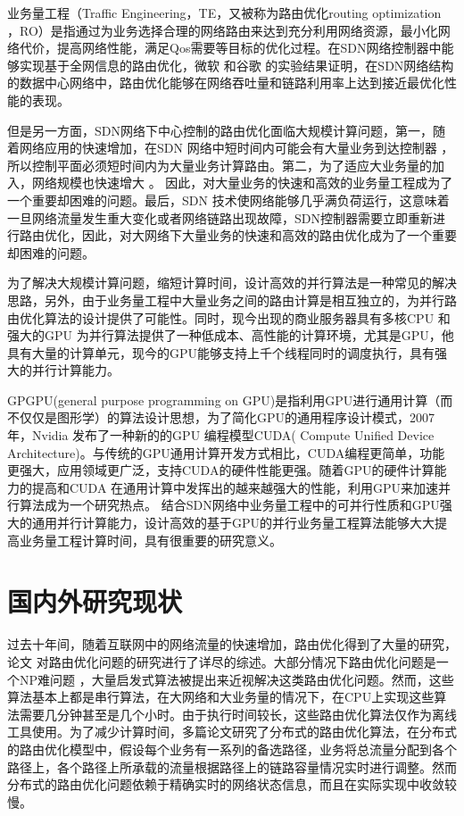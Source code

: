 \documentclass[master]{thesis-uestc}
\begin{document}
业务量工程（Traffic Engineering，TE，又被称为路由优化routing optimization ，RO）是指通过为业务选择合理的网络路由来达到充分利用网络资源，最小化网络代价，提高网络性能，满足Qos需要等目标的优化过程。在SDN网络控制器中能够实现基于全网信息的路由优化，微软 \cite{Microsoft}和谷歌 \cite{Google}的实验结果证明，在SDN网络结构的数据中心网络中，路由优化能够在网络吞吐量和链路利用率上达到接近最优化性能的表现。

但是另一方面，SDN网络下中心控制的路由优化面临大规模计算问题，第一，随着网络应用的快速增加，在SDN 网络中短时间内可能会有大量业务到达控制器 \cite{application}，所以控制平面必须短时间内为大量业务计算路由。第二，为了适应大业务量的加入，网络规模也快速增大\cite{5G} \cite{DCN}。 因此，对大量业务的快速和高效的业务量工程成为了一个重要却困难的问题。最后，SDN 技术使网络能够几乎满负荷运行\cite{Secondrouting}，这意味着一旦网络流量发生重大变化或者网络链路出现故障，SDN控制器需要立即重新进行路由优化，因此，对大网络下大量业务的快速和高效的路由优化成为了一个重要却困难的问题。

为了解决大规模计算问题，缩短计算时间，设计高效的并行算法是一种常见的解决思路，另外，由于业务量工程中大量业务之间的路由计算是相互独立的，为并行路由优化算法的设计提供了可能性。同时，现今出现的商业服务器具有多核CPU 和强大的GPU 为并行算法提供了一种低成本、高性能的计算环境，尤其是GPU，他具有大量的计算单元，现今的GPU能够支持上千个线程同时的调度执行，具有强大的并行计算能力。

GPGPU(general purpose programming on GPU)是指利用GPU进行通用计算（而不仅仅是图形学）的算法设计思想，为了简化GPU的通用程序设计模式，2007 年，Nvidia 发布了一种新的的GPU 编程模型CUDA( Compute Unified Device Architecture)\cite{CUDA}。与传统的GPU通用计算开发方式相比，CUDA编程更简单，功能更强大，应用领域更广泛，支持CUDA的硬件性能更强。随着GPU的硬件计算能力的提高和CUDA 在通用计算中发挥出的越来越强大的性能，利用GPU来加速并行算法成为一个研究热点\cite{CUDAR}。
结合SDN网络中业务量工程中的可并行性质和GPU强大的通用并行计算能力，设计高效的基于GPU的并行业务量工程算法能够大大提高业务量工程计算时间，具有很重要的研究意义。
\section{国内外研究现状}
过去十年间，随着互联网中的网络流量的快速增加，路由优化得到了大量的研究，论文 \cite{TESurvey, TEDef, TESurvey1}对路由优化问题的研究进行了详尽的综述。大部分情况下路由优化问题是一个NP难问题 \cite{NP, multi-commodity}，大量启发式算法\cite{TESurvey, TEDef, TESurvey1}被提出来近视解决这类路由优化问题。然而，这些算法基本上都是串行算法，在大网络和大业务量的情况下，在CPU上实现这些算法需要几分钟甚至是几个小时\cite{SDNTE, ParaTE1, multi-commodity}。由于执行时间较长，这些路由优化算法仅作为离线工具使用\cite{Time}。为了减少计算时间，多篇论文\cite{mate, DATE}研究了分布式的路由优化算法，在分布式的路由优化模型中，假设每个业务有一系列的备选路径，业务将总流量分配到各个路径上，各个路径上所承载的流量根据路径上的链路容量情况实时进行调整。然而分布式的路由优化问题依赖于精确实时的网络状态信息，而且在实际实现中收敛较慢。
\end{document}
